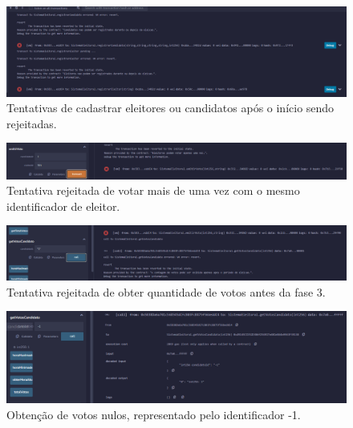\documentclass[portuguese]{textolivre}
\begin{document}
	\begin{figure}[htbp]
		\centering
		\begin{minipage}{1\textwidth}
			\includegraphics[width=\textwidth]{fig-011.png} %
			\caption{Tentativas de cadastrar eleitores ou candidatos após o início sendo rejeitadas.}
			\label{failregistro}
		\end{minipage}
	\end{figure}
	
	\begin{figure}[htbp]
		\centering
		\begin{minipage}{1\textwidth}
			\includegraphics[width=\textwidth]{fig-012.png} %
			\caption{Tentativa rejeitada de votar mais de uma vez com o mesmo identificador de eleitor.}
			\label{failemitirvotomaisdeumavez}
		\end{minipage}
	\end{figure}
	
	
	\begin{figure}[htbp]
		\centering
		\begin{minipage}{1\textwidth}
			\includegraphics[width=\textwidth]{fig-013.png} %
			\caption{Tentativa rejeitada de obter quantidade de votos antes da fase 3.}
			\label{failtentativadevotos}
		\end{minipage}
	\end{figure}
	
	\begin{figure}[htbp]
		\centering
		\begin{minipage}{1\textwidth}
			\includegraphics[width=\textwidth]{fig-014.png} %
			\caption{Obtenção de votos nulos, representado pelo identificador -1.}
			\label{votosnulos}
		\end{minipage}
	\end{figure}
	
\end{document}
